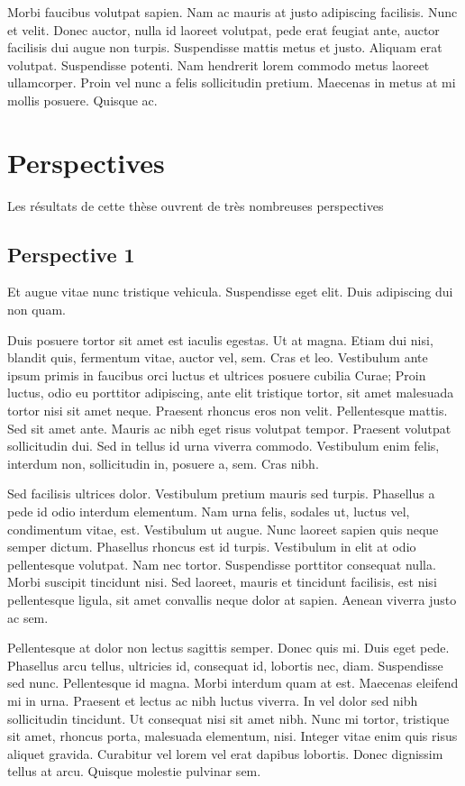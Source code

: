 Morbi faucibus volutpat sapien. Nam ac mauris at justo adipiscing facilisis.
Nunc et velit. Donec auctor, nulla id laoreet volutpat, pede erat feugiat ante,
auctor facilisis dui augue non turpis. Suspendisse mattis metus et justo.
Aliquam erat volutpat. Suspendisse potenti. Nam hendrerit lorem commodo metus
laoreet ullamcorper. Proin vel nunc a felis sollicitudin pretium. Maecenas in
metus at mi mollis posuere. Quisque ac.

\section{Perspectives}

Les résultats de cette thèse ouvrent de très nombreuses perspectives

\subsection{Perspective 1}
\label{conclu:persp:proche}
Et augue vitae nunc tristique vehicula. Suspendisse eget elit. Duis adipiscing
dui non quam.

Duis posuere tortor sit amet est iaculis egestas. Ut at magna. Etiam dui nisi,
blandit quis, fermentum vitae, auctor vel, sem. Cras et leo. Vestibulum ante
ipsum primis in faucibus orci luctus et ultrices posuere cubilia Curae; Proin
luctus, odio eu porttitor adipiscing, ante elit tristique tortor, sit amet
malesuada tortor nisi sit amet neque. Praesent rhoncus eros non velit.
Pellentesque mattis. Sed sit amet ante. Mauris ac nibh eget risus volutpat
tempor. Praesent volutpat sollicitudin dui. Sed in tellus id urna viverra
commodo. Vestibulum enim felis, interdum non, sollicitudin in, posuere a, sem.
Cras nibh.

Sed facilisis ultrices dolor. Vestibulum pretium mauris sed turpis. Phasellus a
pede id odio interdum elementum. Nam urna felis, sodales ut, luctus vel,
condimentum vitae, est. Vestibulum ut augue. Nunc laoreet sapien quis neque
semper dictum. Phasellus rhoncus est id turpis. Vestibulum in elit at odio
pellentesque volutpat. Nam nec tortor. Suspendisse porttitor consequat nulla.
Morbi suscipit tincidunt nisi. Sed laoreet, mauris et tincidunt facilisis, est
nisi pellentesque ligula, sit amet convallis neque dolor at sapien. Aenean
viverra justo ac sem.

Pellentesque at dolor non lectus sagittis semper. Donec quis mi. Duis eget pede.
Phasellus arcu tellus, ultricies id, consequat id, lobortis nec, diam.
Suspendisse sed nunc. Pellentesque id magna. Morbi interdum quam at est.
Maecenas eleifend mi in urna. Praesent et lectus ac nibh luctus viverra. In vel
dolor sed nibh sollicitudin tincidunt. Ut consequat nisi sit amet nibh. Nunc mi
tortor, tristique sit amet, rhoncus porta, malesuada elementum, nisi. Integer
vitae enim quis risus aliquet gravida. Curabitur vel lorem vel erat dapibus
lobortis. Donec dignissim tellus at arcu. Quisque molestie pulvinar sem.


